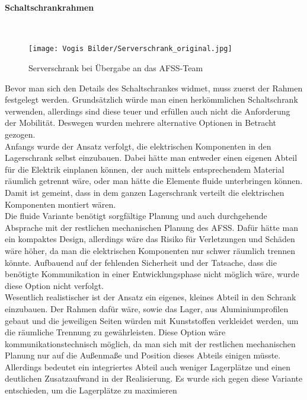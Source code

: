     \paragraph{Schaltschrankrahmen}\mbox{}\\
        \begin{figure}[h]
        \centering
        \texttt{[image: Vogis Bilder/Serverschrank\_original.jpg]}
        \caption{Serverschrank bei Übergabe an das AFSS-Team}
        \label{fig:Serverschrank_original}
    \end{figure}
    Bevor man sich den Details des Schaltschrankes widmet, muss zuerst der Rahmen festgelegt werden. Grundsätzlich würde man einen herkömmlichen Schaltschrank verwenden, allerdings sind diese teuer und erfüllen auch nicht die Anforderung der Mobilität. Deswegen wurden mehrere alternative Optionen in Betracht gezogen.\\
    Anfangs wurde der Ansatz verfolgt, die elektrischen Komponenten in den Lagerschrank selbst einzubauen. Dabei hätte man entweder einen eigenen Abteil für die Elektrik einplanen können, der auch mittels entsprechendem Material räumlich getrennt wäre, oder man hätte die Elemente fluide unterbringen können. Damit ist gemeint, dass in dem ganzen Lagerschrank verteilt die elektrischen Komponenten montiert wären.\\
    Die fluide Variante benötigt sorgfältige Planung und auch durchgehende Absprache mit der restlichen mechanischen Planung des AFSS. Dafür hätte man ein kompaktes Design, allerdings wäre das Risiko für Verletzungen und Schäden wäre höher, da man die elektrischen Komponenten nur schwer räumlich trennen könnte. Aufbauend auf der fehlenden Sicherheit und der Tatsache, dass die benötigte Kommunikation in einer Entwicklungsphase nicht möglich wäre, wurde diese Option nicht verfolgt.\\
    Wesentlich realistischer ist der Ansatz ein eigenes, kleines Abteil in den Schrank einzubauen. Der Rahmen dafür wäre, sowie das Lager, aus Aluminiumprofilen gebaut und die jeweiligen Seiten würden mit Kunststoffen verkleidet werden, um die räumliche Trennung zu gewährleisten. Diese Option wäre kommunikationstechnisch möglich, da man sich mit der restlichen mechanischen Planung nur auf die Außenmaße und Position dieses Abteils einigen müsste. Allerdings bedeutet ein integriertes Abteil auch weniger Lagerplätze und einen deutlichen Zusatzaufwand in der Realisierung. Es wurde sich gegen diese Variante entschieden, um die Lagerplätze zu maximieren\\
